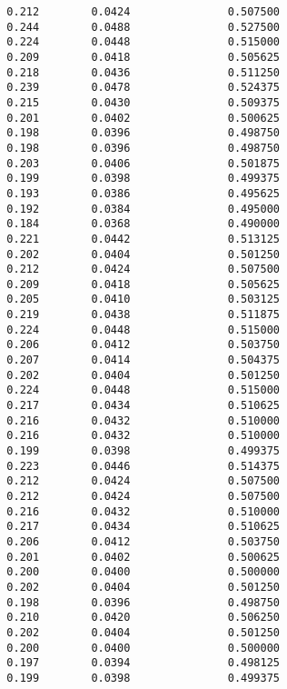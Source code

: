 \documentclass[
  letterpaper,
  DIV=11,
  numbers=noendperiod]{scrartcl}
\begin{document}
\begin{verbatim}
  0.212        0.0424               0.507500              
  0.244        0.0488               0.527500              
  0.224        0.0448               0.515000              
  0.209        0.0418               0.505625              
  0.218        0.0436               0.511250              
  0.239        0.0478               0.524375              
  0.215        0.0430               0.509375              
  0.201        0.0402               0.500625              
  0.198        0.0396               0.498750              
  0.198        0.0396               0.498750              
  0.203        0.0406               0.501875              
  0.199        0.0398               0.499375              
  0.193        0.0386               0.495625              
  0.192        0.0384               0.495000              
  0.184        0.0368               0.490000              
  0.221        0.0442               0.513125              
  0.202        0.0404               0.501250              
  0.212        0.0424               0.507500              
  0.209        0.0418               0.505625              
  0.205        0.0410               0.503125              
  0.219        0.0438               0.511875              
  0.224        0.0448               0.515000              
  0.206        0.0412               0.503750              
  0.207        0.0414               0.504375              
  0.202        0.0404               0.501250              
  0.224        0.0448               0.515000              
  0.217        0.0434               0.510625              
  0.216        0.0432               0.510000              
  0.216        0.0432               0.510000              
  0.199        0.0398               0.499375              
  0.223        0.0446               0.514375              
  0.212        0.0424               0.507500              
  0.212        0.0424               0.507500              
  0.216        0.0432               0.510000              
  0.217        0.0434               0.510625              
  0.206        0.0412               0.503750              
  0.201        0.0402               0.500625              
  0.200        0.0400               0.500000              
  0.202        0.0404               0.501250              
  0.198        0.0396               0.498750              
  0.210        0.0420               0.506250              
  0.202        0.0404               0.501250              
  0.200        0.0400               0.500000              
  0.197        0.0394               0.498125              
  0.199        0.0398               0.499375              

\end{verbatim}
\end{document}
